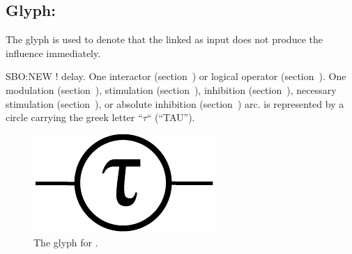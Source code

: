 \color{red}
\subsection{Glyph: }\label{sec:delay}

The glyph  is used to denote that the  linked as input does not produce the influence immediately.

\begin{glyphDescription}
 \glyphSboTerm SBO:NEW ! delay.
 \glyphOrigin One interactor (section~) or logical operator (section~).
 \glyphTarget  One modulation (section~), stimulation (section~), inhibition (section~), necessary  stimulation (section~), or absolute inhibition (section~) arc.
 \glyphNode {} is represented by a circle carrying the greek letter ``$\tau$`` (``TAU'').
 \end{glyphDescription}

\begin{figure}[H]
  \centering
  \includegraphics[scale = 0.5]{images/delay}
  \caption{The \ER glyph for .}
  \label{fig:not}
\end{figure}

